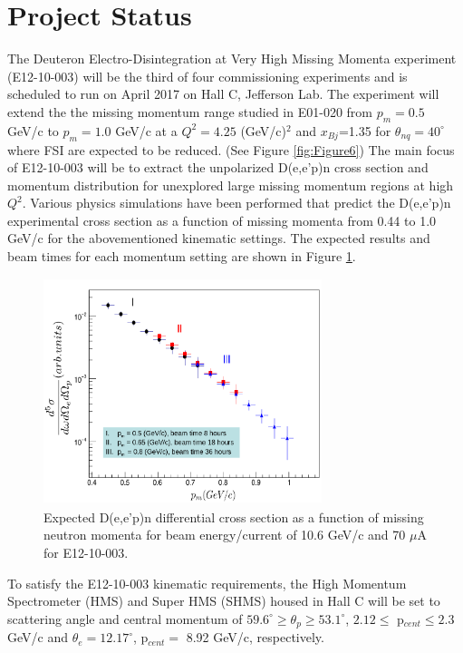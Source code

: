 \documentclass[8pt, twocolumn]{article}
\begin{document}
\section{Project Status}
The Deuteron Electro-Disintegration at Very High Missing Momenta  
experiment (E12-10-003) will be the third of four commissioning experiments and
is scheduled to run on April 2017 on Hall C, Jefferson Lab. The experiment will extend the
the missing momentum range studied in E01-020 from  $p_{m}=0.5$ GeV/c to $p_{m}=1.0$ GeV/c
at a $Q^{2}=4.25$ (GeV/c)$^{2}$ and $x_{Bj}$=1.35 for $\theta_{nq}=40^{\circ}$
where FSI are expected to be reduced. (See Figure \ref{fig:Figure6}) The main focus of E12-10-003
will be to extract the unpolarized D(e,e'p)n cross section and momentum distribution for unexplored
large missing momentum regions at high $Q^{2}$. Various physics simulations have been performed
that predict the D(e,e'p)n experimental cross section as a function of missing momenta from 0.44 to 1.0 GeV/c for the abovementioned kinematic settings. 
The expected results and beam times for each momentum
setting are shown in Figure \ref{fig:Figure8}\cite{mark_pres}.
\begin{figure}[h]
  \centering
  \includegraphics[width=3.2in, height=2.6in]{Exptd_Results.png}
  \caption{Expected D(e,e'p)n differential cross section as a function of missing neutron momenta for beam 
  energy/current of 10.6 GeV/c and 70 $\mu$A for E12-10-003.\cite{mark_pres}}
  \label{fig:Figure8}
\end{figure}
To satisfy the E12-10-003 kinematic requirements, the High Momentum Spectrometer (HMS) and Super HMS (SHMS) housed in Hall C will be set to
scattering angle and central momentum of $59.6^{\circ}\geq\theta_{p}\geq53.1^{\circ}$, $2.12\leq$ p$_{cent}\leq2.3$ GeV/c 
and $\theta_{e}=12.17^{\circ}$, p$_{cent}=$ 8.92 GeV/c, respectively. \\  
\end{document}
